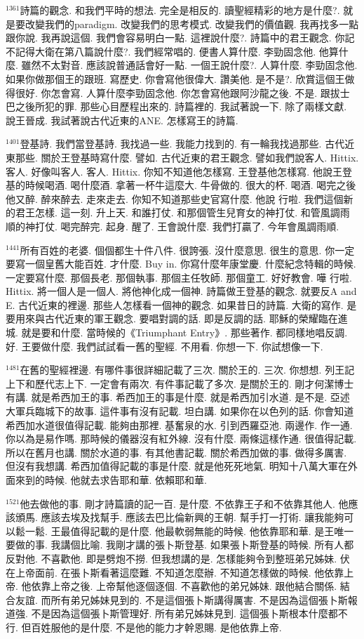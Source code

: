 \documentclass{book}
\begin{document}
$^{1361}$詩篇的觀念.
和我們平時的想法.
完全是相反的.
讀聖經精彩的地方是什麼?.
就是要改變我們的paradigm.
改變我們的思考模式.
改變我們的價值觀.
我再找多一點跟你說.
我再說這個.
我們會容易明白一點.
這裡說什麼?.
詩篇中的君王觀念.
你記不記得大衛在第八篇說什麼?.
我們經常唱的.
便書人算什麼.
李勁固念他.
他算什麼.
雖然不太對音.
應該說普通話會好一點.
一個王說什麼?.
人算什麼.
李勁固念他.
如果你做那個王的跟班.
寫歷史.
你會寫他很偉大.
讚美他.
是不是?.
欣賞這個王做得很好.
你怎會寫.
人算什麼李勁固念他.
你怎會寫他跟阿沙龍之後.
不是.
跟拔士巴之後所犯的罪.
那些心目歷程出來的.
詩篇裡的.
我試著說一下.
除了兩樣文獻.
說王晉成.
我試著說古代近東的ANE.
怎樣寫王的詩篇.

$^{1401}$登基詩.
我們當登基詩.
我找過一些.
我能力找到的.
有一輪我找過那些.
古代近東那些.
關於王登基時寫什麼.
譬如.
古代近東的君王觀念.
譬如我們說客人.
Hittix.
客人.
好像叫客人.
客人.
Hittix.
你知不知道他怎樣寫.
王登基他怎樣寫.
他說王登基的時候喝酒.
喝什麼酒.
拿著一杯牛這麼大.
牛骨做的.
很大的杯.
喝酒.
喝完之後他又醉.
醉來醉去.
走來走去.
你知不知道那些史官寫什麼.
他說 行啦.
我們這個新的君王怎樣.
這一刻.
升上天.
和誰打仗.
和那個管生兒育女的神打仗.
和管風調雨順的神打仗.
喝完醉完.
起身.
醒了.
王會說什麼.
我們打贏了.
今年會風調雨順.

$^{1441}$所有百姓的老婆.
個個都生十件八件.
很誇張.
沒什麼意思.
很生的意思.
你一定要寫一個皇舊大能百姓.
才什麼.
Buy in.
你寫什麼年康堂慶.
什麼紀念特輯的時候.
一定要寫什麼.
那個長老.
那個執事.
那個主任牧師.
那個童工.
好好教會.
嘩 行啦.
Hittix.
將一個人是一個人.
將他神化成一個神.
詩篇做王登基的觀念.
就要反A and E.
古代近東的裡邊.
那些人怎樣看一個神的觀念.
如果昔日的詩篇.
大衛的寫作.
是要用來與古代近東的軍王觀念.
要唱對調的話.
即是反調的話.
耶穌的榮耀臨在進城.
就是要和什麼.
當時候的《Triumphant Entry》.
那些著作.
都同樣地唱反調.
好.
王要做什麼.
我們試試看一舊的聖經.
不用看.
你想一下.
你試想像一下.

$^{1481}$在舊的聖經裡邊.
有哪件事很詳細記載了三次.
關於王的.
三次.
你想想.
列王記上下和歷代志上下.
一定會有兩次.
有件事記載了多次.
是關於王的.
剛才何潔博士有講.
就是希西加王的事.
希西加王的事是什麼.
就是希西加引水道.
是不是.
亞述大軍兵臨城下的故事.
這件事有沒有記載.
坦白講.
如果你在以色列的話.
你會知道希西加水道很值得記載.
能夠由那裡.
基奮泉的水.
引到西羅亞池.
兩邊作.
作一通.
你以為是易作嗎.
那時候的儀器沒有紅外線.
沒有什麼.
兩條這樣作通.
很值得記載.
所以在舊月也講.
關於水道的事.
有其他書記載.
關於希西加做的事.
做得多厲害.
但沒有我想講.
希西加值得記載的事是什麼.
就是他死死地氣.
明知十八萬大軍在外面來到的時候.
他就去求告耶和華.
依賴耶和華.

$^{1521}$他去做他的事.
剛才詩篇讀的記一百.
是什麼.
不依靠王子和不依靠其他人.
他應該頒馬.
應該去埃及找幫手.
應該去巴比倫新興的王朝.
幫手打一打術.
讓我能夠可以鬆一鬆.
王最值得記載的是什麼.
他最軟弱無能的時候.
他依靠耶和華.
是王唯一要做的事.
我講個比喻.
我剛才講的張卜斯登基.
如果張卜斯登基的時候.
所有人都反對他.
不喜歡他.
即是劈炮不撈.
但我想講的是.
怎樣能夠令到整班弟兄姊妹.
伏在上帝面前.
在張卜斯看著這麼難.
不知道怎麼辦.
不知道怎樣做的時候.
他依靠上帝.
他依靠上帝之後.
上帝幫他逐個逐個.
不喜歡他的弟兄姊妹.
跟他結合關係.
結合友誼.
而所有弟兄姊妹見到的.
不是這個張卜斯講得厲害.
不是因為這個張卜斯報道強.
不是因為這個張卜斯管理好.
所有弟兄姊妹見到.
這個張卜斯根本什麼都不行.
但百姓服他的是什麼.
不是他的能力才幹恩賜.
是他依靠上帝.
\end{document}
